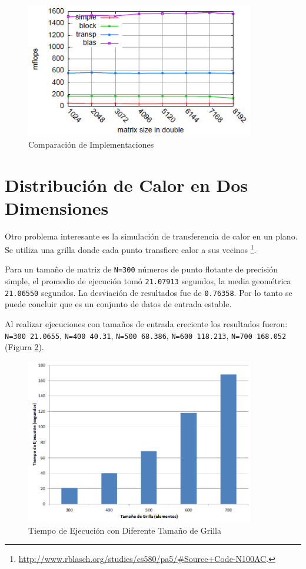 \documentclass[a4paper]{report}
\begin{document}
\begin{figure}[H]
\label{fig:mm}
\begin{center}
\includegraphics[width=10cm]{mm.png}
\caption{Comparación de Implementaciones}
\end{center}
\end{figure}

\section{Distribución de Calor en Dos Dimensiones}

Otro problema interesante es la simulación de transferencia de calor en un plano.
Se utiliza una grilla donde cada punto transfiere calor a sus vecinos \footnote{\href{http://www.rblasch.org/studies/cs580/pa5/\#Source+Code-N100AC}{http://www.rblasch.org/studies/cs580/pa5/\#Source+Code-N100AC}.}.

\bigskip

Para un tamaño de matriz de {\tt N=300} números de punto flotante de precisión simple, el promedio de ejecución tomó {\tt 21.07913} segundos, la media geométrica {\tt 21.06550} segundos. La desviación de resultados fue de {\tt 0.76358}.
Por lo tanto se puede concluir que es un conjunto de datos de entrada estable.

\bigskip

Al realizar ejecuciones con tamaños de entrada creciente los resultados fueron:
{\tt N=300 21.0655}, {\tt N=400 40.31}, {\tt N=500 68.386}, {\tt N=600 118.213}, {\tt N=700 168.052} (Figura \ref{fig:heat-problem}).

\begin{figure}[H]
\centering
\includegraphics[width=10cm]{heat-problem.png}
\caption{Tiempo de Ejecución con Diferente Tamaño de Grilla}
\label{fig:heat-problem}
\end{figure}
\end{document}
